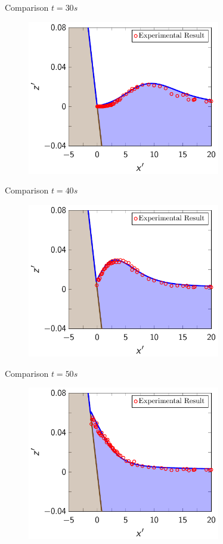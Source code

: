 \documentclass[pdf]{beamer}
\begin{document}
\begin{frame}{Comparison $t=30s$}
		\begin{figure}
			\includegraphics[width=0.75\textwidth]{./Pics/Synolakis/t=30s.pdf}
		\end{figure}
\end{frame}

\begin{frame}{Comparison $t=40s$}
	\begin{figure}
		\includegraphics[width=0.75\textwidth]{./Pics/Synolakis/t=40s.pdf}
	\end{figure}
\end{frame}

\begin{frame}{Comparison $t=50s$}
	\begin{figure}
		\includegraphics[width=0.75\textwidth]{./Pics/Synolakis/t=50s.pdf}
	\end{figure}
\end{frame}
\end{document}
